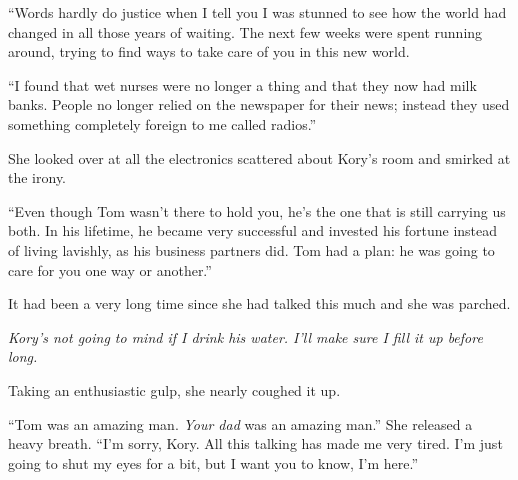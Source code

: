 ``Words hardly do justice when I tell you I was stunned to see how the world had changed in all those years of waiting. The next few weeks were spent running around, trying to find ways to take care of you in this new world.

``I found that wet nurses were no longer a thing and that they now had milk banks. People no longer relied on the newspaper for their news; instead they used something completely foreign to me called radios.''

She looked over at all the electronics scattered about Kory's room and smirked at the irony.

``Even though Tom wasn't there to hold you, he's the one that is still carrying us both. In his lifetime, he became very successful and invested his fortune instead of living lavishly, as his business partners did. Tom had a plan: he was going to care for you one way or another.''

It had been a very long time since she had talked this much and she was parched.

\textit{Kory's not going to mind if I drink his water. I'll make sure I fill it up before long.}

Taking an enthusiastic gulp, she nearly coughed it up.

``Tom was an amazing man. \textit{Your dad} was an amazing man.'' She released a heavy breath. ``I'm sorry, Kory. All this talking has made me very tired. I'm just going to shut my eyes for a bit, but I want you to know, I'm here.''

\line



\line



\line


